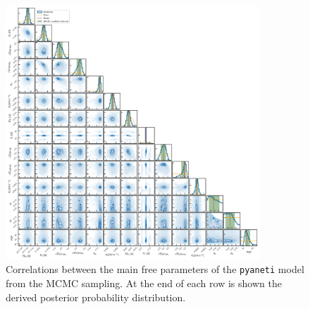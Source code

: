 \documentclass[traditabstract,longauth]{aa}
\begin{document}
\begin{figure}[ht!]
\centering
\includegraphics[width=0.85\textwidth]{figures/TOI2458_2plnts_correlations.png}
\caption{Correlations between the main free parameters of the {\tt pyaneti} model from the MCMC sampling. At the end of each row is shown the derived posterior probability distribution.} \label{fig:corr}
\end{figure}
\end{document}

